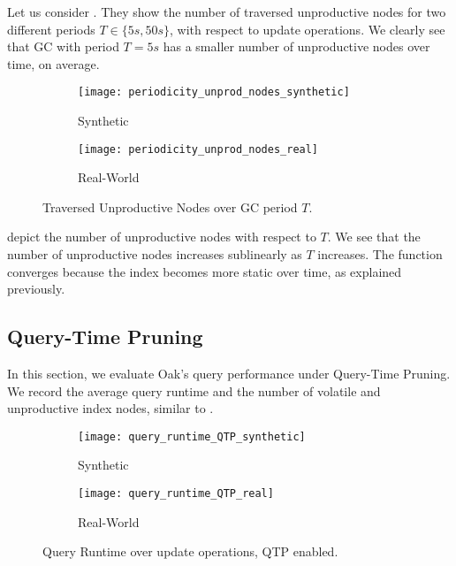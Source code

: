 \documentclass[abstracton,12pt]{scrartcl}
\theoremstyle{definition}
\begin{document}
Let us consider 
.
They show the number of traversed unproductive nodes for two different periods
$T \in \{5s,50s\}$, with respect to update operations. We clearly see that GC with
period $T = 5s$ has a smaller number of unproductive nodes over time, on average.

\begin{figure}[h]
  \centering
  \begin{subfigure}{0.49\linewidth}
    \centering
    \caption{Synthetic}
    \texttt{[image: periodicity\_unprod\_nodes\_synthetic]}
    \label{fig:periodicity_unprod_nodes_synthetic}
  \end{subfigure}
  \begin{subfigure}{0.49\linewidth}
    \centering
    \caption{Real-World}
    \texttt{[image: periodicity\_unprod\_nodes\_real]}
    \label{fig:periodicity_unprod_nodes_real}
  \end{subfigure}
  \vspace{-0.5cm}
  \caption{Traversed Unproductive Nodes over GC period $T$.}
\end{figure}

depict the number of unproductive nodes with respect to $T$. We see that the
number of unproductive nodes increases sublinearly as $T$ increases.
The function converges because the index becomes more static over time, as
explained previously.

\subsection{Query-Time Pruning}

\label{sec:qtp-experiment}

In this section, we evaluate Oak's query performance under Query-Time
Pruning. We record the average query runtime and the number of volatile
and unproductive index nodes, similar to .

\begin{figure}[h]
  \centering
  \begin{subfigure}{0.49\linewidth}
    \centering
    \caption{Synthetic}
    \texttt{[image: query\_runtime\_QTP\_synthetic]}
    \label{fig:query_runtime_QTP_synthetic}
  \end{subfigure}
  \begin{subfigure}{0.49\linewidth}
    \centering
    \caption{Real-World}
    \texttt{[image: query\_runtime\_QTP\_real]}
    \label{fig:query_runtime_QTP_real}
  \end{subfigure}
  \vspace{-0.5cm}
  \caption{Query Runtime over update operations, QTP enabled.}
\end{figure}
\end{document}
